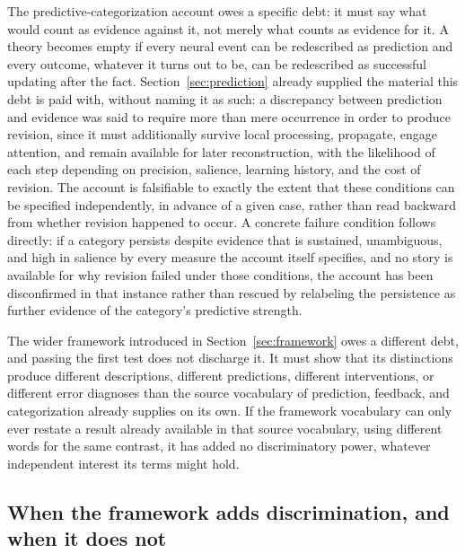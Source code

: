 \documentclass[11pt]{article}
\begin{document}
The predictive-categorization account owes a specific debt: it must say what would count as evidence against it, not merely what counts as evidence for it. A theory becomes empty if every neural event can be redescribed as prediction and every outcome, whatever it turns out to be, can be redescribed as successful updating after the fact. Section~\ref{sec:prediction} already supplied the material this debt is paid with, without naming it as such: a discrepancy between prediction and evidence was said to require more than mere occurrence in order to produce revision, since it must additionally survive local processing, propagate, engage attention, and remain available for later reconstruction, with the likelihood of each step depending on precision, salience, learning history, and the cost of revision. The account is falsifiable to exactly the extent that these conditions can be specified independently, in advance of a given case, rather than read backward from whether revision happened to occur. A concrete failure condition follows directly: if a category persists despite evidence that is sustained, unambiguous, and high in salience by every measure the account itself specifies, and no story is available for why revision failed under those conditions, the account has been disconfirmed in that instance rather than rescued by relabeling the persistence as further evidence of the category's predictive strength.

The wider framework introduced in Section~\ref{sec:framework} owes a different debt, and passing the first test does not discharge it. It must show that its distinctions produce different descriptions, different predictions, different interventions, or different error diagnoses than the source vocabulary of prediction, feedback, and categorization already supplies on its own. If the framework vocabulary can only ever restate a result already available in that source vocabulary, using different words for the same contrast, it has added no discriminatory power, whatever independent interest its terms might hold.

\subsection{When the framework adds discrimination, and when it does not}
\end{document}
